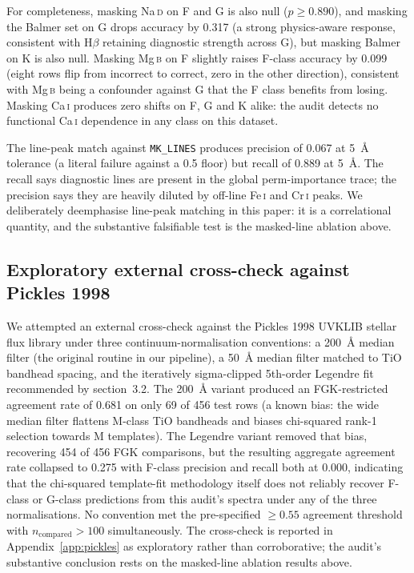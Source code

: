 \documentclass[11pt,a4paper]{article}
\newcommand{\Hbeta}{H$\beta$\xspace}
\newcommand{\Mgb}{Mg\,\textsc{b}\xspace}
\newcommand{\NaD}{Na\,\textsc{d}\xspace}
\newcommand{\CaI}{Ca\,\textsc{i}\xspace}
\newcommand{\FeI}{Fe\,\textsc{i}\xspace}
\newcommand{\CrI}{Cr\,\textsc{i}\xspace}
\begin{document}
For completeness, masking \NaD on F and G is also null ($p \geq 0.890$), and masking the Balmer set on G drops accuracy by 0.317 (a strong physics-aware response, consistent with \Hbeta retaining diagnostic strength across G), but masking Balmer on K is also null. Masking \Mgb on F slightly raises F-class accuracy by 0.099 (eight rows flip from incorrect to correct, zero in the other direction), consistent with \Mgb being a confounder against G that the F class benefits from losing. Masking \CaI produces zero shifts on F, G and K alike: the audit detects no functional \CaI dependence in any class on this dataset.

The line-peak match against \texttt{MK\_LINES} produces precision of 0.067 at 5~\AA{} tolerance (a literal failure against a 0.5 floor) but recall of 0.889 at 5~\AA{}. The recall says diagnostic lines are present in the global perm-importance trace; the precision says they are heavily diluted by off-line \FeI and \CrI peaks. We deliberately deemphasise line-peak matching in this paper: it is a correlational quantity, and the substantive falsifiable test is the masked-line ablation above.

\subsection{Exploratory external cross-check against Pickles 1998}

We attempted an external cross-check against the Pickles 1998 UVKLIB stellar flux library \citep{1998PASP..110..863P} under three continuum-normalisation conventions: a 200~\AA{} median filter (the original routine in our pipeline), a 50~\AA{} median filter matched to TiO bandhead spacing, and the iteratively sigma-clipped 5th-order Legendre fit recommended by \citet{1998PASP..110..863P} section~3.2. The 200~\AA{} variant produced an FGK-restricted agreement rate of 0.681 on only 69 of 456 test rows (a known bias: the wide median filter flattens M-class TiO bandheads and biases chi-squared rank-1 selection towards M templates). The Legendre variant removed that bias, recovering 454 of 456 FGK comparisons, but the resulting aggregate agreement rate collapsed to 0.275 with F-class precision and recall both at 0.000, indicating that the chi-squared template-fit methodology itself does not reliably recover F-class or G-class predictions from this audit's spectra under any of the three normalisations. No convention met the pre-specified $\geq 0.55$ agreement threshold with $n_{\mathrm{compared}} > 100$ simultaneously. The cross-check is reported in Appendix~\ref{app:pickles} as exploratory rather than corroborative; the audit's substantive conclusion rests on the masked-line ablation results above.
\end{document}
